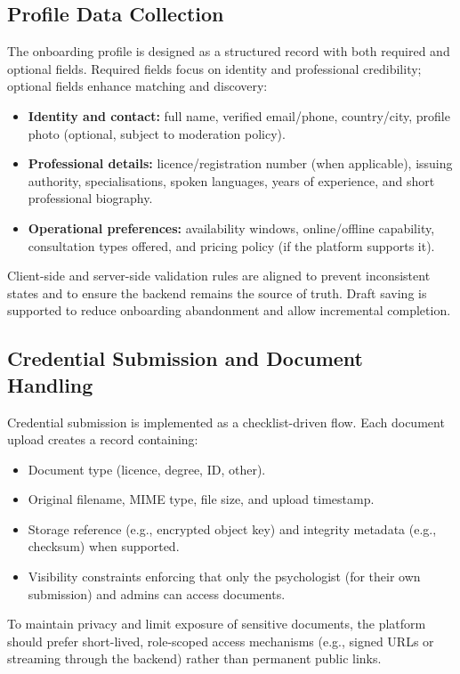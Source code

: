 \subsection{Profile Data Collection}
The onboarding profile is designed as a structured record with both required
and optional fields. Required fields focus on identity and professional
credibility; optional fields enhance matching and discovery:

\begin{itemize}
    \item \textbf{Identity and contact:} full name, verified email/phone,
    country/city, profile photo (optional, subject to moderation policy).
    \item \textbf{Professional details:} licence/registration number (when
    applicable), issuing authority, specialisations, spoken languages, years of
    experience, and short professional biography.
    \item \textbf{Operational preferences:} availability windows, online/offline
    capability, consultation types offered, and pricing policy (if the platform
    supports it).
\end{itemize}

Client-side and server-side validation rules are aligned to prevent inconsistent
states and to ensure the backend remains the source of truth. Draft saving is
supported to reduce onboarding abandonment and allow incremental completion.

\subsection{Credential Submission and Document Handling}
Credential submission is implemented as a checklist-driven flow. Each document
upload creates a record containing:

\begin{itemize}
    \item Document type (licence, degree, ID, other).
    \item Original filename, MIME type, file size, and upload timestamp.
    \item Storage reference (e.g., encrypted object key) and integrity metadata
    (e.g., checksum) when supported.
    \item Visibility constraints enforcing that only the psychologist (for their
    own submission) and admins can access documents.
\end{itemize}

To maintain privacy and limit exposure of sensitive documents, the platform
should prefer short-lived, role-scoped access mechanisms (e.g., signed URLs or
streaming through the backend) rather than permanent public links.

